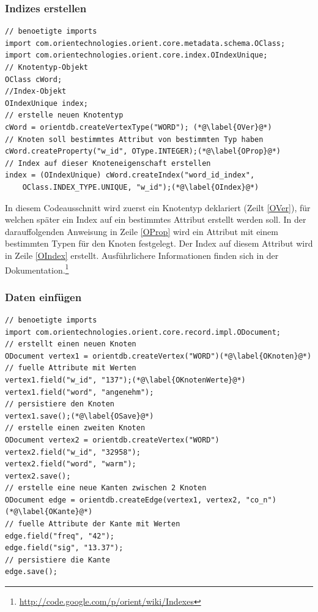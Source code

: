 \documentclass[11pt, a4paper, oneside]{article} %
\begin{document}
\subsubsection{Indizes erstellen}
\begin{lstlisting}[caption={OrientDB - Indizes erstellen}]
// benoetigte imports
import com.orientechnologies.orient.core.metadata.schema.OClass;
import com.orientechnologies.orient.core.index.OIndexUnique;
// Knotentyp-Objekt
OClass cWord;
//Index-Objekt
OIndexUnique index;
// erstelle neuen Knotentyp
cWord = orientdb.createVertexType("WORD"); (*@\label{OVer}@*)
// Knoten soll bestimmtes Attribut von bestimmten Typ haben
cWord.createProperty("w_id", OType.INTEGER);(*@\label{OProp}@*)
// Index auf dieser Knoteneigenschaft erstellen
index = (OIndexUnique) cWord.createIndex("word_id_index",
	OClass.INDEX_TYPE.UNIQUE, "w_id");(*@\label{OIndex}@*)
\end{lstlisting}
In diesem Codeausschnitt wird zuerst ein Knotentyp deklariert (Zeilt \ref{OVer}), für welchen später ein Index auf ein bestimmtes Attribut erstellt werden soll. In der darauffolgenden Anweisung in Zeile \ref{OProp} wird ein Attribut mit einem bestimmten Typen für den Knoten festgelegt. Der Index auf diesem Attribut wird in Zeile \ref{OIndex} erstellt. 
Ausführlichere Informationen finden sich in der Dokumentation.\footnote{\url{http://code.google.com/p/orient/wiki/Indexes}}


\subsubsection{Daten einfügen}
\begin{lstlisting}[caption={OrientDB - Daten einfügen}]
// benoetigte imports
import com.orientechnologies.orient.core.record.impl.ODocument;
// erstellt einen neuen Knoten
ODocument vertex1 = orientdb.createVertex("WORD")(*@\label{OKnoten}@*)
// fuelle Attribute mit Werten
vertex1.field("w_id", "137");(*@\label{OKnotenWerte}@*)
vertex1.field("word", "angenehm");
// persistiere den Knoten
vertex1.save();(*@\label{OSave}@*)
// erstelle einen zweiten Knoten
ODocument vertex2 = orientdb.createVertex("WORD")
vertex2.field("w_id", "32958");
vertex2.field("word", "warm");
vertex2.save();
// erstelle eine neue Kanten zwischen 2 Knoten
ODocument edge = orientdb.createEdge(vertex1, vertex2, "co_n")(*@\label{OKante}@*)
// fuelle Attribute der Kante mit Werten
edge.field("freq", "42");
edge.field("sig", "13.37");
// persistiere die Kante
edge.save();
\end{lstlisting}
\end{document}
